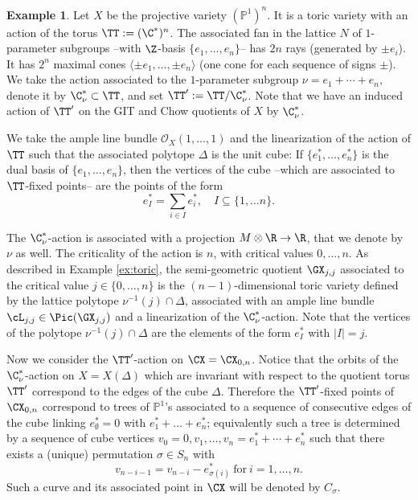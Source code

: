 \documentclass[reqno]{amsproc}
\theoremstyle{definition}
\newtheorem{example}[theorem]{Example}
\begin{document}
\begin{example}\label{ex:perm} Let $X$ be the projective variety $(\mathbb{P}^1)^n$. It  is a toric variety with an action of the torus $\TT:=(\C^*)^n$.  
The associated fan in the lattice $N$ of $1$-parameter subgroups --with $\Z$-basis $\{e_1,\dots, e_n\}$-- has $2n$ rays (generated by  $\pm e_i$). It has $2^n$ maximal cones $\langle \pm e_1, \dots, \pm e_n\rangle$ (one cone for each sequence of signs $\pm$). We take the action associated to the $1$-parameter subgroup $\nu=e_1+\cdots+e_n$, denote it by $\C^*_\nu\subset \TT$, and set $\TT':=\TT/\C^*_\nu$. Note that we have an induced action of $\TT'$ on the GIT and Chow quotients of $X$ by $\C^*_\nu$.

    We take the ample line bundle $\mathcal{O}_X(1,\dots,1)$ and the linearization of the action of $\TT$ such that the associated polytope $\Delta$ is the unit cube:  If $\{e_1^*,\dots, e_n^*\}$ is the dual basis of $\{e_1,\dots, e_n\}$, then the vertices of the cube --which are associated to $\TT$-fixed points-- are the points of the form $$e^*_I=\sum_{i\in I} e_i^*,\quad I\subseteq\{1,\dots n\}.$$
    
    The $\C^*_\nu$-action  
    is associated with a projection $ M\otimes\R\to \R$, that we denote by $\nu$ as well. The criticality of the action is $n$, with critical values $0,\dots,n$. As described in Example \ref{ex:toric}, the semi-geometric quotient $\GX_{j,j}$ associated to the critical value $j\in\{0,\dots,n\}$ is the $(n-1)$-dimensional toric variety defined by the lattice polytope $\nu^{-1}(j)\cap \Delta$, associated with an ample line bundle $\cL_{j,j}\in \Pic(\GX_{j,j})$ and a linearization of the $\C^*_\nu$-action. Note that the vertices of the polytope $\nu^{-1}(j)\cap \Delta$ are the elements of the form $e^*_I$ with $|I|=j$.  
    
Now we consider the $\TT'$-action on $\CX=\CX_{0,n}$. Notice that the orbits of the $\C^*_\nu$-action  on $X=X(\Delta)$ which are invariant with respect to the quotient torus $\TT'$ correspond to the edges of the cube $\Delta$. Therefore the $\TT'$-fixed points of $\CX_{0,n}$  correspond to trees of $\mathbb{P}^1$'s associated to a sequence of consecutive edges of the cube linking $e^*_\emptyset=0$ with $e^*_1+\dots +e^*_n$; equivalently such a tree is determined by a sequence of cube vertices $v_0=0,v_1,\dots,v_n=e^*_1+\cdots+e^*_n$ such that there exists a (unique) permutation $\sigma\in S_n$ with $$v_{n-i-1}=v_{n-i}-e^*_{\sigma(i)}\ \text{for}\ i=1,\dots,n.$$ 
Such a curve and its associated point in $\CX$ will be denoted by $C_\sigma$. 


\end{example}
\end{document}
